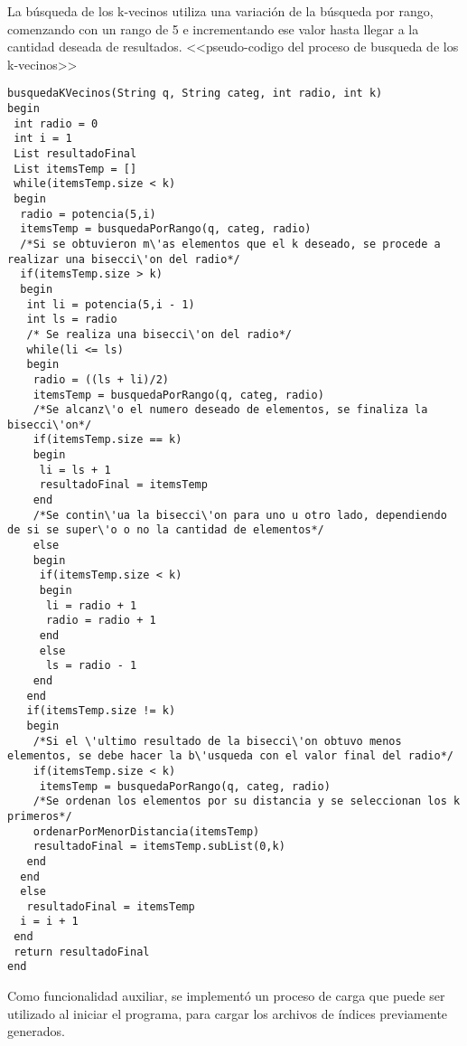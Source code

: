 La b\'usqueda de los k-vecinos utiliza una variaci\'on de la b\'usqueda por 
rango, comenzando con un rango de 5 e incrementando ese valor hasta llegar a la
 cantidad deseada de resultados.
<<pseudo-codigo del proceso de busqueda de los k-vecinos>>
\begin{lstlisting}
busquedaKVecinos(String q, String categ, int radio, int k)
begin
 int radio = 0
 int i = 1
 List resultadoFinal
 List itemsTemp = []
 while(itemsTemp.size < k)
 begin
  radio = potencia(5,i)
  itemsTemp = busquedaPorRango(q, categ, radio)
  /*Si se obtuvieron m\'as elementos que el k deseado, se procede a realizar una bisecci\'on del radio*/
  if(itemsTemp.size > k)
  begin
   int li = potencia(5,i - 1)
   int ls = radio
   /* Se realiza una bisecci\'on del radio*/
   while(li <= ls)
   begin
    radio = ((ls + li)/2)
    itemsTemp = busquedaPorRango(q, categ, radio)
    /*Se alcanz\'o el numero deseado de elementos, se finaliza la bisecci\'on*/
    if(itemsTemp.size == k)
    begin
     li = ls + 1
     resultadoFinal = itemsTemp
    end
    /*Se contin\'ua la bisecci\'on para uno u otro lado, dependiendo de si se super\'o o no la cantidad de elementos*/
    else
    begin
     if(itemsTemp.size < k)
     begin
      li = radio + 1
      radio = radio + 1
     end
     else
      ls = radio - 1
    end
   end
   if(itemsTemp.size != k)
   begin
    /*Si el \'ultimo resultado de la bisecci\'on obtuvo menos elementos, se debe hacer la b\'usqueda con el valor final del radio*/
    if(itemsTemp.size < k)
     itemsTemp = busquedaPorRango(q, categ, radio)
    /*Se ordenan los elementos por su distancia y se seleccionan los k primeros*/
    ordenarPorMenorDistancia(itemsTemp)
    resultadoFinal = itemsTemp.subList(0,k)
   end
  end
  else
   resultadoFinal = itemsTemp
  i = i + 1 
 end
 return resultadoFinal
end
\end{lstlisting}

Como funcionalidad auxiliar, se implement\'o un proceso de carga que puede ser 
utilizado al iniciar el programa, para cargar los archivos de \'indices 
previamente generados.

